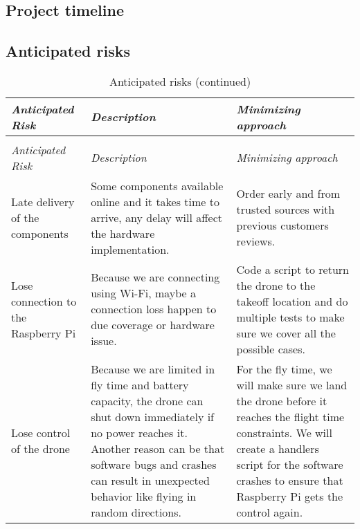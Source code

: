 \documentclass[../main.tex]{subfiles}
\begin{document}
\subsection{Project timeline}



\subsection{Anticipated risks}

\begin{center}
    \begin{xltabular}{\textwidth}{ X X X }
        \caption{Anticipated risks.}
        \label{tab:risks} \\
        \toprule
        \textit{Anticipated Risk} 
        & \textit{Description} 
        & \textit{Minimizing approach} \\
        \midrule
        \endfirsthead

        \caption[]{Anticipated risks (continued)} \\
        \toprule
        \textit{Anticipated Risk} 
        & \textit{Description} 
        & \textit{Minimizing approach} \\
        \midrule
        \endhead

        Late delivery of the components 
        & Some components available online 
        and it takes time to arrive, 
        any delay will affect the hardware implementation.
        & Order early and from trusted sources with previous 
        customers reviews. \\
        
        Lose connection to the Raspberry Pi
        & Because we are connecting using Wi-Fi, 
        maybe a connection loss 
        happen to due coverage or hardware issue.
        & Code a script to return the drone 
        to the takeoff location 
        and do multiple tests to make sure 
        we cover all the possible cases. \\
        
        Lose control of the drone
        & Because we are limited in fly time 
        and battery capacity, 
        the drone can shut down immediately if 
        no power reaches it.
        Another reason can be that software bugs 
        and crashes can 
        result in unexpected behavior like flying 
        in random directions.
        & For the fly time, we will make sure 
        we land the drone before it reaches 
        the flight time constraints.
        We will create a handlers script 
        for the software crashes 
        to ensure that Raspberry Pi gets the 
        control again.  \\
        

\end{xltabular}
\end{center}
\end{document}
